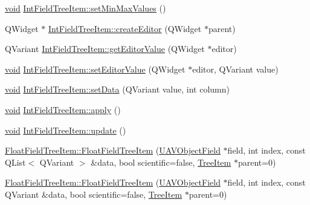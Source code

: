 \begin{DoxyCompactItemize}
\item 
\hyperlink{group___u_a_v_objects_plugin_ga444cf2ff3f0ecbe028adce838d373f5c}{void} \hyperlink{group___u_a_v_object_browser_plugin_ga04070de761838b1f1df2c69a3b0c4529}{\-Int\-Field\-Tree\-Item\-::set\-Min\-Max\-Values} ()
\item 
\-Q\-Widget $\ast$ \hyperlink{group___u_a_v_object_browser_plugin_ga1ce7bba5d398e5db5afb25a1fdecc2cd}{\-Int\-Field\-Tree\-Item\-::create\-Editor} (\-Q\-Widget $\ast$parent)
\item 
\-Q\-Variant \hyperlink{group___u_a_v_object_browser_plugin_ga1bfea485d5919a5c2548115597aa5644}{\-Int\-Field\-Tree\-Item\-::get\-Editor\-Value} (\-Q\-Widget $\ast$editor)
\item 
\hyperlink{group___u_a_v_objects_plugin_ga444cf2ff3f0ecbe028adce838d373f5c}{void} \hyperlink{group___u_a_v_object_browser_plugin_ga5c67d501056c61f098c9166f9e8bdef5}{\-Int\-Field\-Tree\-Item\-::set\-Editor\-Value} (\-Q\-Widget $\ast$editor, \-Q\-Variant value)
\item 
\hyperlink{group___u_a_v_objects_plugin_ga444cf2ff3f0ecbe028adce838d373f5c}{void} \hyperlink{group___u_a_v_object_browser_plugin_ga3a9f3c8507db3aeab86e7bfafd5ab91b}{\-Int\-Field\-Tree\-Item\-::set\-Data} (\-Q\-Variant value, int column)
\item 
\hyperlink{group___u_a_v_objects_plugin_ga444cf2ff3f0ecbe028adce838d373f5c}{void} \hyperlink{group___u_a_v_object_browser_plugin_ga24ca9e240126f614a138454ca00bd6b1}{\-Int\-Field\-Tree\-Item\-::apply} ()
\item 
\hyperlink{group___u_a_v_objects_plugin_ga444cf2ff3f0ecbe028adce838d373f5c}{void} \hyperlink{group___u_a_v_object_browser_plugin_ga8d58b6ded0f3e8c6d46cd4de99d0f061}{\-Int\-Field\-Tree\-Item\-::update} ()
\item 
\hyperlink{group___u_a_v_object_browser_plugin_ga3b5f17797e8c15bda91990e0224e64fd}{\-Float\-Field\-Tree\-Item\-::\-Float\-Field\-Tree\-Item} (\hyperlink{class_u_a_v_object_field}{\-U\-A\-V\-Object\-Field} $\ast$field, int index, const \-Q\-List$<$ \-Q\-Variant $>$ \&data, bool scientific=false, \hyperlink{class_tree_item}{\-Tree\-Item} $\ast$parent=0)
\item 
\hyperlink{group___u_a_v_object_browser_plugin_ga2295cc6ac1cdf63b9bf6a35970e79669}{\-Float\-Field\-Tree\-Item\-::\-Float\-Field\-Tree\-Item} (\hyperlink{class_u_a_v_object_field}{\-U\-A\-V\-Object\-Field} $\ast$field, int index, const \-Q\-Variant \&data, bool scientific=false, \hyperlink{class_tree_item}{\-Tree\-Item} $\ast$parent=0)
\item 

\end{DoxyCompactItemize}
